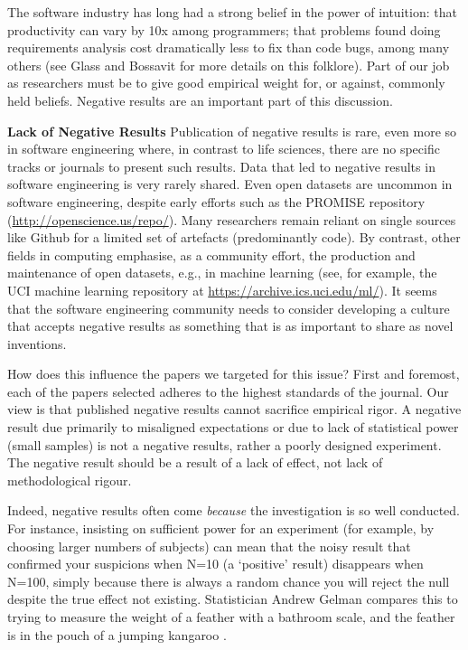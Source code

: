 \documentclass{svjour3}                     %
\begin{document}
The software industry has long had a strong belief in the power of intuition: that productivity can vary by 10x among programmers; that problems found doing requirements analysis cost dramatically less to fix than code bugs, among many others (see Glass \cite{glass} and Bossavit \cite{bossavit} for more details on this folklore). Part of our job as researchers must be to give good empirical weight for, or against, commonly held beliefs. Negative results are an important part of this discussion.

\noindent\textbf{Lack of Negative Results }
Publication of negative results is rare, even more so in software engineering where, in contrast to life sciences, there are no specific tracks or journals to present such results. Data that led to negative results in software engineering is very rarely shared. Even open datasets are uncommon in software engineering, despite early efforts such as the PROMISE repository (\url{http://openscience.us/repo/}). Many researchers remain reliant on single sources like Github for a limited set of artefacts (predominantly code). By contrast, other fields in computing emphasise, as a community effort, the production and maintenance of open datasets, e.g., in machine learning (see, for example, the UCI machine learning repository at \url{https://archive.ics.uci.edu/ml/}). It seems that the software engineering community needs to consider developing a culture that accepts negative results as something that is as important to share as novel inventions.

How does this influence the papers we targeted for this issue? First and foremost, each of the papers selected adheres to the highest standards of the journal.
Our view is that published negative results cannot sacrifice empirical rigor. A negative result due primarily to misaligned expectations or due to lack of statistical power (small samples) is not a negative results, rather a poorly designed experiment. The negative result should be a result of a lack of effect, not lack of methodological rigour.

Indeed, negative results often come \emph{because} the investigation is so well conducted. For instance, insisting on sufficient power for an experiment (for example, by choosing larger numbers of subjects) can mean that the noisy result that confirmed your suspicions when N=10 (a `positive' result) disappears when N=100, simply because there is always a random chance you will reject the null despite the true effect not existing. Statistician Andrew Gelman compares this to trying to measure the weight of a feather with a bathroom scale, and the feather is in the pouch of a jumping kangaroo \cite{gelman}.
\end{document}
